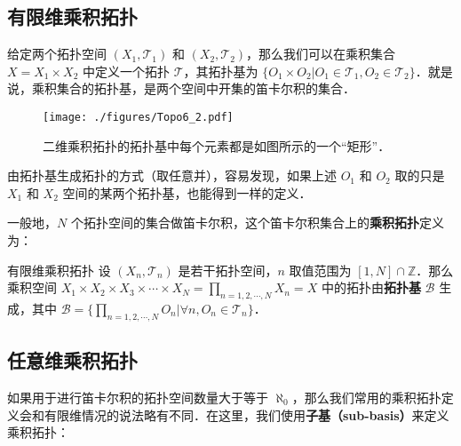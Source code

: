 

\subsection{有限维乘积拓扑}

给定两个拓扑空间 $(X_1, \mathcal{T}_1)$ 和 $(X_2, \mathcal{T}_2)$，那么我们可以在乘积集合 $X=X_1\times X_2$ 中定义一个拓扑 $\mathcal{T}$，其拓扑基为 $\{O_1\times O_2|O_1\in\mathcal{T_1}, O_2\in\mathcal{T_2}\}$．就是说，乘积集合的拓扑基，是两个空间中开集的笛卡尔积的集合．

\begin{figure}[ht]
\centering
\texttt{[image: ./figures/Topo6\_2.pdf]}
\caption{二维乘积拓扑的拓扑基中每个元素都是如图所示的一个“矩形”．} \label{Topo6_fig2}
\end{figure}

由拓扑基生成拓扑的方式（取任意并），容易发现，如果上述 $O_1$ 和 $O_2$ 取的只是 $X_1$ 和 $X_2$ 空间的某两个拓扑基，也能得到一样的定义．

一般地，$N$ 个拓扑空间的集合做笛卡尔积，这个笛卡尔积集合上的\textbf{乘积拓扑}定义为：

\begin{definition}{有限维乘积拓扑}
设 $(X_n, \mathcal{T}_n)$ 是若干拓扑空间，$n$ 取值范围为 $[1, N]\cap\mathbb{Z}$．那么乘积空间 $X_1\times X_2\times X_3\times\cdots\times X_N=\prod\limits_{n=1,2,\cdots,N}X_n=X$ 中的拓扑由\textbf{拓扑基} $\mathcal{B}$ 生成，其中 $\mathcal{B}=\{\prod\limits_{n=1,2,\cdots,N}O_n|\forall n, O_n\in\mathcal{T}_n\}$．
\end{definition}

\subsection{任意维乘积拓扑}

如果用于进行笛卡尔积的拓扑空间数量大于等于 $\aleph_0$，那么我们常用的乘积拓扑定义会和有限维情况的说法略有不同．在这里，我们使用\textbf{子基（sub-basis）}来定义乘积拓扑：

